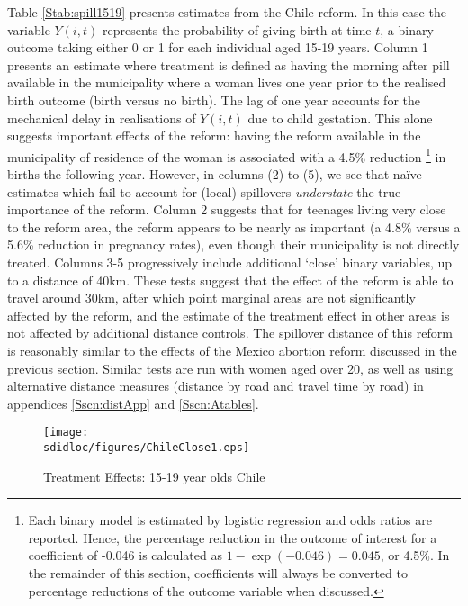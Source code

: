 Table \ref{Stab:spill1519} presents estimates from the Chile reform.  In this case 
the variable $Y(i,t)$ represents the probability of giving birth at time $t$, a 
binary outcome taking either 0 or 1 for each individual aged 15-19 years. Column 1 
presents an estimate where treatment is defined as having the morning after pill 
available in the municipality where a woman lives one year prior to the realised 
birth outcome (birth versus no birth).  The lag of one year accounts for the 
mechanical delay in realisations of $Y(i,t)$ due to child gestation.  This alone 
suggests important effects of the reform: having the reform available in the 
municipality of residence of the woman is associated with a 4.5\% reduction%
\footnote{Each binary model is estimated by logistic regression and odds ratios
are reported.  Hence, the percentage reduction in the outcome of interest for a
coefficient of -0.046 is calculated as $1-\exp(-0.046)=0.045$, or 4.5\%.  In the
remainder of this section, coefficients will always be converted to percentage
reductions of the outcome variable when discussed.} in births the following year.  
However, in columns (2) to (5), we see that na\"ive estimates which fail to account 
for (local) spillovers \emph{understate} the true importance of the reform.  Column 
2 suggests that for teenages living very close to the reform area, the reform 
appears to be nearly as important (a 4.8\% versus a 5.6\% reduction in pregnancy
rates), even though their municipality is not directly treated.  Columns 3-5 
progressively  include additional `close' binary variables, up to a distance of
40km.  These tests suggest that the effect of the reform is able to travel around 
30km, after which point marginal areas are not significantly affected by the 
reform, and the estimate of the treatment effect in other areas is not affected by
additional distance controls. The spillover distance of this reform is reasonably 
similar to the effects of the Mexico abortion reform discussed in the previous 
section.  Similar tests are run with women aged over 20, as well as using 
alternative distance measures (distance by road and travel time by road) in 
appendices \ref{Sscn:distApp} and \ref{Sscn:Atables}.

\begin{figure}[h!]
\texttt{[image: \\sdidloc/figures/ChileClose1.eps]}
\caption{Treatment Effects: 15-19 year olds Chile}
\label{Sfig:ChileAlpha}
\vspace{2mm}
\end{figure}


